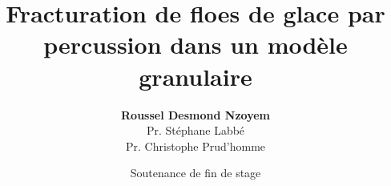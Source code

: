 \documentclass[compress]{beamer}
\begin{document}

\title[\textsc{Fracturation de floes de glace}]{\LARGE Fracturation de floes de glace par percussion dans un modèle granulaire}

\author[Roussel Desmond Nzoyem]{\large \textbf{Roussel Desmond Nzoyem} \\ \vspace*{0.15cm} \small Pr. Stéphane Labbé \\ Pr. Christophe Prud'homme}



\date[Soutenance de fin de stage 2021]{Soutenance de fin de stage\\}


\begingroup



  \begin{frame}[fragile]
    \vspace*{1.3cm}
    \maketitle
  \end{frame}
\endgroup
\end{document}

